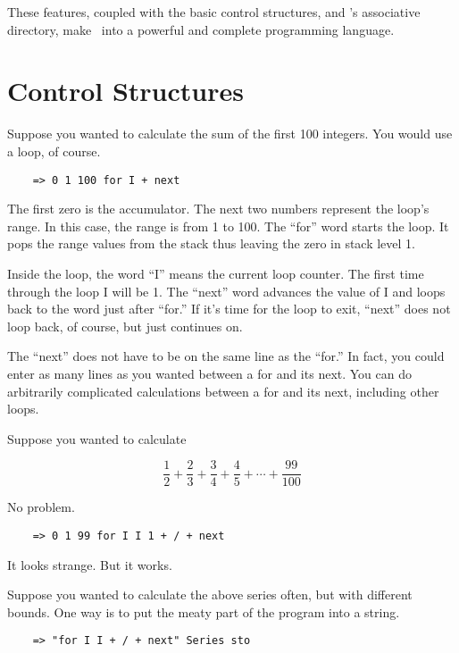 These features, coupled with the basic control structures, and \CLAC's associative directory,
make \CLAC\ into a powerful and complete programming language.

\section{Control Structures}

Suppose you wanted to calculate the sum of the first 100 integers. You would use a loop, of
course.

\begin{verbatim}
    => 0 1 100 for I + next
\end{verbatim}

The first zero is the accumulator. The next two numbers represent the loop's range. In this
case, the range is from 1 to 100. The ``for'' word starts the loop. It pops the range values
from the stack thus leaving the zero in stack level 1.

Inside the loop, the word ``I'' means the current loop counter. The first time through the loop
I will be 1. The ``next'' word advances the value of I and loops back to the word just after
``for.'' If it's time for the loop to exit, ``next'' does not loop back, of course, but just
continues on.

The ``next'' does not have to be on the same line as the ``for.'' In fact, you could enter as
many lines as you wanted between a for and its next. You can do arbitrarily complicated
calculations between a for and its next, including other loops.

Suppose you wanted to calculate

\begin{displaymath}
     \frac{1}{2} + \frac{2}{3} + \frac{3}{4} + \frac{4}{5} + \cdots + \frac{99}{100}
\end{displaymath}

No problem.

\begin{verbatim}
    => 0 1 99 for I I 1 + / + next
\end{verbatim}

It looks strange. But it works.

Suppose you wanted to calculate the above series often, but with different bounds. One way is to
put the meaty part of the program into a string.

\begin{verbatim}
    => "for I I + / + next" Series sto
\end{verbatim}

